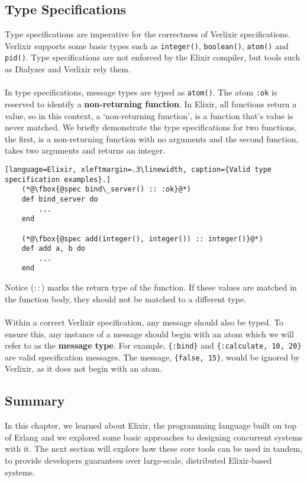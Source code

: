 \subsection{Type Specifications}
Type specifications are imperative for the correctness of Verlixir specifications. Verlixir supports some basic types such as \texttt{integer()}, \texttt{boolean()}, \texttt{atom()} and \texttt{pid()}. Type specifications are not enforced by the Elixir compiler, but tools such as Dialyzer and Verlixir rely them.
\\ \\
In type specifications, message types are typed as \texttt{atom()}. The atom \texttt{:ok} is reserved to identify a \textbf{non-returning function}. In Elixir, all functions return a value, so in this context, a `non-returning function', is a function that's value is never matched. We briefly demonstrate the type specifications for two functions, the first, is a non-returning function with no arguments and the second function, takes two arguments and returns an integer.
\begin{lstlisting}[language=Elixir, xleftmargin=.3\linewidth, caption={Valid type specification examples}.]
    (*@\fbox{@spec bind\_server() :: :ok}@*)
    def bind_server do
        ...
    end

    (*@\fbox{@spec add(integer(), integer()) :: integer()}@*)
    def add a, b do
        ...
    end
\end{lstlisting}
Notice ($::$) marks the return type of the function. If these values are matched in the function body, they should not be matched to a different type.
\\ \\
Within a correct Verlixir specification, any message should also be typed. To ensure this, any instance of a message should begin with an atom which we will refer to as the \textbf{message type}. For example, \texttt{\{:bind\}} and \texttt{\{:calculate, 10, 20\}} are valid specification messages. The message, \texttt{\{false, 15\}}, would be ignored by Verlixir, as it does not begin with an atom. 
\subsection{Summary}
In this chapter, we learned about Elixir, the programming language built on top of Erlang and we explored some basic approaches to designing concurrent systems with it. The next section will explore how these core tools can be used in tandem, to provide developers guarantees over large-scale, distributed Elixir-based systems.